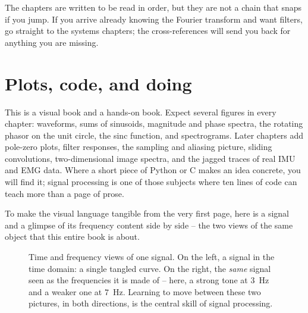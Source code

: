 The chapters are written to be read in order, but they are not a chain that snaps if you
jump. If you arrive already knowing the Fourier transform and want filters, go straight to
the systems chapters; the cross-references will send you back for anything you are missing.

\section*{Plots, code, and doing}

This is a visual book and a hands-on book. Expect several figures in every chapter:
waveforms, sums of sinusoids, magnitude and phase spectra, the rotating phasor on the unit
circle, the sinc function, and spectrograms. Later chapters add pole-zero plots, filter responses, the sampling
and aliasing picture, sliding convolutions, two-dimensional image spectra, and
the jagged traces of real IMU and EMG data. Where a short piece of Python or C makes an idea
concrete, you will find it; signal processing is one of those subjects where ten lines of
code can teach more than a page of prose.

To make the visual language tangible from the very first page, here is a signal and a
glimpse of its frequency content side by side -- the two views of the same object that this
entire book is about.

\begin{figure}[htbp]
\centering
{}
\caption{Time and frequency views of one signal. On the left, a signal in the time domain: a single
tangled curve. On the right, the \emph{same} signal seen as the frequencies it is made of --
here, a strong tone at $3$~Hz and a weaker one at $7$~Hz. Learning to move between these two
pictures, in both directions, is the central skill of signal processing.}
\label{ch00:two-views}
\end{figure}

